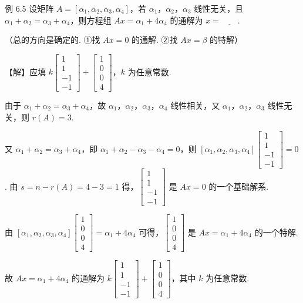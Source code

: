 \begin{fcard}{例 6.5}
设矩阵 $A=[\alpha_1,\alpha_2,\alpha_3,\alpha_4]$，若 $\alpha_1$，$\alpha_2$，$\alpha_3$ 线性无关，且 $\alpha_1+\alpha_2=\alpha_3+\alpha_4$，则方程组 $Ax=\alpha_1+4\alpha_4$ 的通解为 $x=\underline{\hspace{2em}}$.

（总的方向是确定的. ①找 $Ax=0$ 的通解. ②找 $Ax=\beta$ 的特解）


【解】应填 $k\begin{bmatrix}1\\1\\-1\\-1\end{bmatrix}+\begin{bmatrix}1\\0\\0\\4\end{bmatrix}$，$k$ 为任意常数.

由于 $\alpha_1+\alpha_2=\alpha_3+\alpha_4$，故 $\alpha_1$，$\alpha_2$，$\alpha_3$，$\alpha_4$ 线性相关，又 $\alpha_1$，$\alpha_2$，$\alpha_3$ 线性无关，则 $r(A)=3$.

又 $\alpha_1+\alpha_2=\alpha_3+\alpha_4$，即 $\alpha_1+\alpha_2-\alpha_3-\alpha_4=0$，则 $[\alpha_1,\alpha_2,\alpha_3,\alpha_4]\begin{bmatrix}1\\1\\-1\\-1\end{bmatrix}=0$. 由 $s=n-r(A)=4-3=1$ 得，$\begin{bmatrix}1\\1\\-1\\-1\end{bmatrix}$ 是 $Ax=0$ 的一个基础解系.

由 $[\alpha_1,\alpha_2,\alpha_3,\alpha_4]\begin{bmatrix}1\\0\\0\\4\end{bmatrix}=\alpha_1+4\alpha_4$ 可得，$\begin{bmatrix}1\\0\\0\\4\end{bmatrix}$ 是 $Ax=\alpha_1+4\alpha_4$ 的一个特解.

故 $Ax=\alpha_1+4\alpha_4$ 的通解为 $k\begin{bmatrix}1\\1\\-1\\-1\end{bmatrix}+\begin{bmatrix}1\\0\\0\\4\end{bmatrix}$，其中 $k$ 为任意常数.
\end{fcard}

